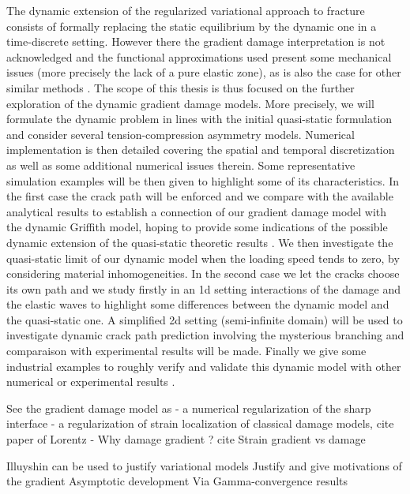 The dynamic extension \cite{Bourdin:2011} of the regularized variational approach to fracture consists of formally replacing the static equilibrium by the dynamic one in a time-discrete setting. However there the gradient damage interpretation is not acknowledged and the functional approximations used present some mechanical issues (more precisely the lack of a pure elastic zone), as is also the case for other similar methods \cite{BordenVerhooselScottHughesLandis:2012,HofackerMiehe:2012,SchlueterWillenbuecherKuhnMueller:2014}. The scope of this thesis is thus focused on the further exploration of the dynamic gradient damage models. More precisely, we will formulate the dynamic problem in lines with the initial quasi-static formulation \cite{PhamMarigo:2010-1} and consider several tension-compression asymmetry models. Numerical implementation is then detailed covering the spatial and temporal discretization as well as some additional numerical issues therein. Some representative simulation examples will be then given to highlight some of its characteristics. In the first case the crack path will be enforced and we compare with the available analytical results to establish a connection of our gradient damage model with the dynamic Griffith model, hoping to provide some indications of the possible dynamic extension of the quasi-static theoretic results \cite{SicsicMarigo:2013}. We then investigate the quasi-static limit of our dynamic model when the loading speed tends to zero, by considering material inhomogeneities. In the second case we let the cracks choose its own path and we study firstly in an 1d setting interactions of the damage and the elastic waves to highlight some differences between the dynamic model and the quasi-static one. A simplified 2d setting (semi-infinite domain) will be used to investigate dynamic crack path prediction involving the mysterious branching and comparaison with experimental results \cite{Ravi-ChandarKnauss:1984a,Ravi-ChandarKnauss:1984b} will be made. Finally we give some industrial examples to roughly verify and validate this dynamic model with other numerical or experimental results \cite{SongWangBelytschko:2008}.


See the gradient damage model as
- a numerical regularization of the sharp interface
- a regularization of strain localization of classical damage models, cite paper of Lorentz
- Why damage gradient ? cite Strain gradient vs damage

Illuyshin can be used to justify variational models
Justify and give motivations of the gradient
Asymptotic development
Via Gamma-convergence results

